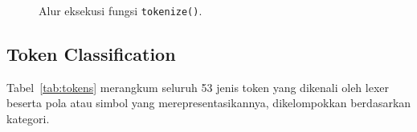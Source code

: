 \documentclass[11pt,a4paper]{article}
\begin{document}
\begin{figure}[H]
\caption{Alur eksekusi fungsi \texttt{tokenize()}.}
\label{fig:flow}
\end{figure}

\subsection{Token Classification}

Tabel~\ref{tab:tokens} merangkum seluruh 53 jenis token yang dikenali oleh lexer
beserta pola atau simbol yang merepresentasikannya, dikelompokkan berdasarkan kategori.
\end{document}
